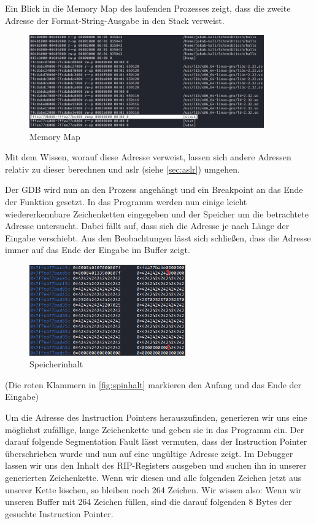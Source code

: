 Ein Blick in die Memory Map des laufenden Prozesses zeigt, dass die zweite Adresse der Format-String-Ausgabe
in den Stack verweist.
\begin{figure}[h]
    \centering
    \includegraphics[width=0.9\textwidth,height=0.75\textheight,keepaspectratio]{images/map.png}
    \caption{Memory Map}
\end{figure}

Mit dem Wissen, worauf diese Adresse verweist, lassen sich andere Adressen relativ zu dieser berechnen und
\gls*{aslr} (siehe \ref{sec:aslr}) umgehen.

Der GDB wird nun an den Prozess angehängt und ein Breakpoint an das Ende der  Funktion gesetzt.
In das Programm werden nun einige leicht wiedererkennbare Zeichenketten eingegeben und der Speicher um die
betrachtete Adresse untersucht. Dabei fällt auf, dass sich die Adresse je nach Länge der Eingabe verschiebt.
Aus den Beobachtungen lässt sich schließen, dass die Adresse immer auf das Ende der Eingabe im Buffer zeigt.
\begin{figure}[h]
    \centering
    \includegraphics[width=0.6\textwidth,height=0.75\textheight,keepaspectratio]{images/buffer.png}
    \caption{Speicherinhalt}
    \label{fig:spinhalt}
\end{figure}

(Die roten Klammern in \autoref{fig:spinhalt} markieren den Anfang und das Ende der Eingabe)

Um die Adresse des Instruction Pointers herauszufinden, generieren wir uns eine möglichst zufällige,
lange Zeichenkette und geben sie in das Programm ein. Der darauf folgende Segmentation Fault lässt vermuten,
dass der Instruction Pointer überschrieben wurde und nun auf eine ungültige Adresse zeigt. Im Debugger lassen wir
uns den Inhalt des RIP-Registers ausgeben und suchen ihn in unserer generierten Zeichenkette. Wenn wir diesen und
alle folgenden Zeichen jetzt aus unserer Kette löschen, so bleiben noch 264 Zeichen. Wir wissen also: Wenn wir unseren
Buffer mit 264 Zeichen füllen, sind die darauf folgenden 8 Bytes der gesuchte Instruction Pointer. \cite{computerphile}

